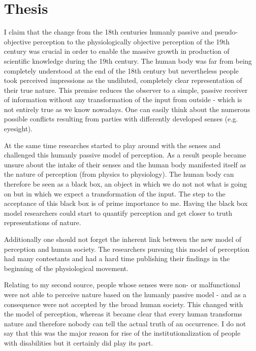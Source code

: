 \documentclass[12pt,a4paper]{article}
\begin{document}
\section*{Thesis}

I claim that the change from the 18th centuries humanly passive and pseudo-objective
perception to the physiologically objective perception of the 19th century was crucial in order to
enable the massive growth in production of scientific knowledge during the 19th century.
The human body was far from being completely understood at the end of the 18th century but
nevertheless people took perceived impressions as the undiluted, completely clear representation of
their true nature.
This premise reduces the observer to a simple, passive receiver of information without any transformation
of the input from outside - which is not entirely true as we know nowadays.
One can easily think about the numerous possible conflicts resulting from parties with differently developed
senses (e.g. eyesight).

At the same time researches started to play around with the senses and challenged this humanly passive model
of perception. As a result people became unsure about the intake of their senses and the human body
manifested itself as the nature of perception (from physics to physiology). The human body can therefore be
seen as a black box, an object in which we do not not what is going on but in which we expect a
transformation of the input. The step to the acceptance of this black box is of prime importance to me.
Having the black box model researchers could start to quantify perception and get closer to truth
representations of nature.

Additionally one should not forget the inherent link between the new model of perception and human society.
The researchers pursuing this model of perception had many contestants and had a hard time publishing
their findings in the beginning of the physiological movement.

\newpage

Relating to my second source, people whose senses were non- or malfunctional were not able to perceive nature
based on the humanly passive model - and as a consequence were not accepted by the broad human society. This
changed with the model of perception, whereas it became clear that every human transforms nature and
therefore nobody can tell the actual truth of an occurrence. I do not say that this was the major reason for
rise of the institutionalization of people with disabilities but it certainly did play its part.
\end{document}
